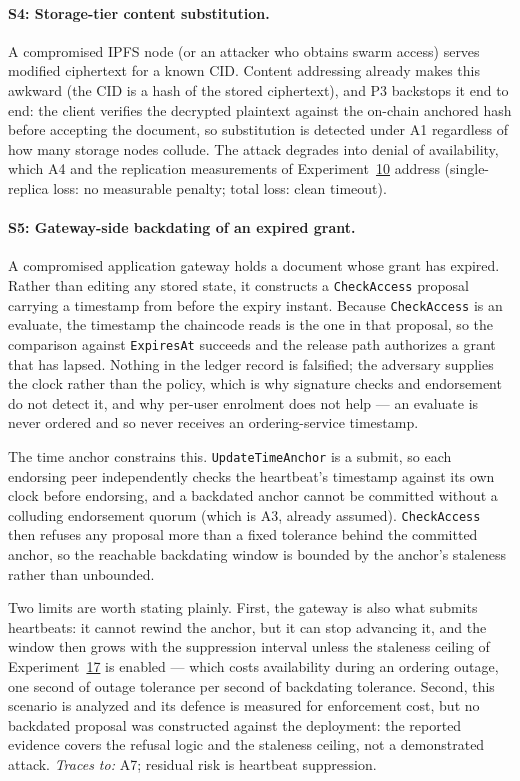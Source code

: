 \documentclass[preprint,12pt]{elsarticle}
\begin{document}
\paragraph{S4: Storage-tier content substitution.} A compromised IPFS
node (or an attacker who obtains swarm access) serves modified
ciphertext for a known CID. Content addressing already makes this
awkward (the CID is a hash of the stored ciphertext), and P3
backstops it end to end: the client verifies the decrypted plaintext
against the on-chain anchored hash before accepting the document, so
substitution is detected under A1 regardless of how many storage
nodes collude. The attack degrades into denial of availability,
which A4 and the replication measurements of
Experiment~\hyperref[sec:exp_ipfscost]{10} address (single-replica
loss: no measurable penalty; total loss: clean timeout).

\paragraph{S5: Gateway-side backdating of an expired grant.} A
compromised application gateway holds a document whose grant has
expired. Rather than editing any stored state, it constructs a
\texttt{CheckAccess} proposal carrying a timestamp from before the
expiry instant. Because \texttt{CheckAccess} is an evaluate, the
timestamp the chaincode reads is the one in that proposal, so the
comparison against \texttt{ExpiresAt} succeeds and the release path
authorizes a grant that has lapsed. Nothing in the ledger record is
falsified; the adversary supplies the clock rather than the policy,
which is why signature checks and endorsement do not detect it, and why
per-user enrolment does not help --- an evaluate is never ordered and so
never receives an ordering-service timestamp.

The time anchor constrains this. \texttt{UpdateTimeAnchor} is a submit,
so each endorsing peer independently checks the heartbeat's timestamp
against its own clock before endorsing, and a backdated anchor cannot be
committed without a colluding endorsement quorum (which is A3, already
assumed). \texttt{CheckAccess} then refuses any proposal more than a
fixed tolerance behind the committed anchor, so the reachable backdating
window is bounded by the anchor's staleness rather than unbounded.

Two limits are worth stating plainly. First, the gateway is also what
submits heartbeats: it cannot rewind the anchor, but it can stop
advancing it, and the window then grows with the suppression interval
unless the staleness ceiling of
Experiment~\hyperref[sec:exp_timeanchor]{17} is enabled --- which costs
availability during an ordering outage, one second of outage tolerance
per second of backdating tolerance. Second, this scenario is analyzed
and its defence is measured for enforcement cost, but no backdated
proposal was constructed against the deployment: the reported evidence
covers the refusal logic and the staleness ceiling, not a demonstrated
attack. \emph{Traces to:} A7; residual risk is heartbeat suppression.
\end{document}
